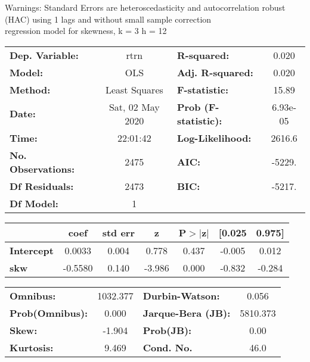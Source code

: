 Warnings: \newline
 [1] Standard Errors are heteroscedasticity and autocorrelation robust (HAC) using 1 lags and without small sample correction\\ 

regression model for skewness, k = 3 h = 12\begin{center}
\begin{tabular}{lclc}
\toprule
\textbf{Dep. Variable:}    &       rtrn       & \textbf{  R-squared:         } &     0.020   \\
\textbf{Model:}            &       OLS        & \textbf{  Adj. R-squared:    } &     0.020   \\
\textbf{Method:}           &  Least Squares   & \textbf{  F-statistic:       } &     15.89   \\
\textbf{Date:}             & Sat, 02 May 2020 & \textbf{  Prob (F-statistic):} &  6.93e-05   \\
\textbf{Time:}             &     22:01:42     & \textbf{  Log-Likelihood:    } &    2616.6   \\
\textbf{No. Observations:} &        2475      & \textbf{  AIC:               } &    -5229.   \\
\textbf{Df Residuals:}     &        2473      & \textbf{  BIC:               } &    -5217.   \\
\textbf{Df Model:}         &           1      & \textbf{                     } &             \\
\bottomrule
\end{tabular}
\begin{tabular}{lcccccc}
                   & \textbf{coef} & \textbf{std err} & \textbf{z} & \textbf{P$> |$z$|$} & \textbf{[0.025} & \textbf{0.975]}  \\
\midrule
\textbf{Intercept} &       0.0033  &        0.004     &     0.778  &         0.437        &       -0.005    &        0.012     \\
\textbf{skw}       &      -0.5580  &        0.140     &    -3.986  &         0.000        &       -0.832    &       -0.284     \\
\bottomrule
\end{tabular}
\begin{tabular}{lclc}
\textbf{Omnibus:}       & 1032.377 & \textbf{  Durbin-Watson:     } &    0.056  \\
\textbf{Prob(Omnibus):} &   0.000  & \textbf{  Jarque-Bera (JB):  } & 5810.373  \\
\textbf{Skew:}          &  -1.904  & \textbf{  Prob(JB):          } &     0.00  \\
\textbf{Kurtosis:}      &   9.469  & \textbf{  Cond. No.          } &     46.0  \\
\bottomrule
\end{tabular}
\end{center}


